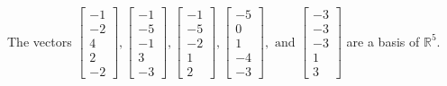 \begin{exercise}
\begin{exerciseStatement}
  \end{exerciseStatement}
  \begin{exerciseAnswer}
   The vectors \(\left[\begin{array}{r}
-1 \\
-2 \\
4 \\
2 \\
-2
\end{array}\right] , \left[\begin{array}{r}
-1 \\
-5 \\
-1 \\
3 \\
-3
\end{array}\right] , \left[\begin{array}{r}
-1 \\
-5 \\
-2 \\
1 \\
2
\end{array}\right] , \left[\begin{array}{r}
-5 \\
0 \\
1 \\
-4 \\
-3
\end{array}\right] , \text{ and } \left[\begin{array}{r}
-3 \\
-3 \\
-3 \\
1 \\
3
\end{array}\right]\) 
  	 are  a basis of \(\mathbb{R}^5\).
  


  \end{exerciseAnswer}
\end{exercise}